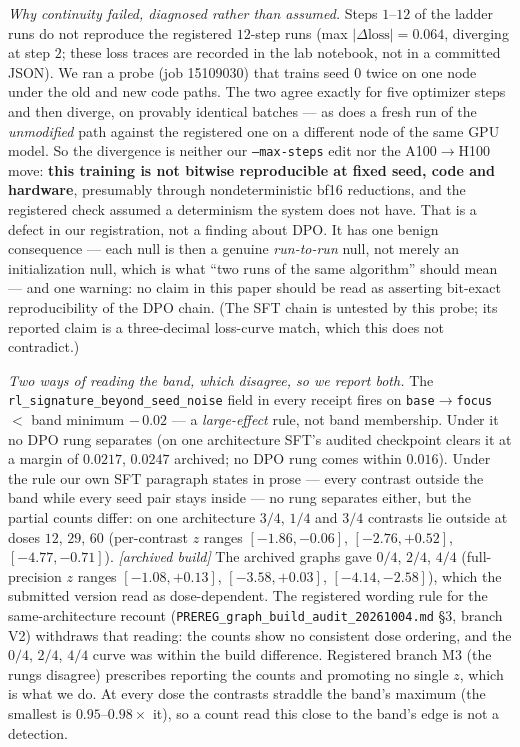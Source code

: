 \documentclass{article}
\begin{document}
\emph{Why continuity failed, diagnosed rather than assumed.} Steps $1$--$12$ of the ladder runs do not reproduce the registered $12$-step runs (max $|\Delta\text{loss}|=0.064$, diverging at step $2$; these loss traces are recorded in the lab notebook, not in a committed JSON). We ran a probe (job 15109030) that trains seed $0$ twice on one node under the old and new code paths. The two agree exactly for five optimizer steps and then diverge, on provably identical batches --- as does a fresh run of the \emph{unmodified} path against the registered one on a different node of the same GPU model. So the divergence is neither our \texttt{--max-steps} edit nor the A100$\to$H100 move: \textbf{this training is not bitwise reproducible at fixed seed, code and hardware}, presumably through nondeterministic bf16 reductions, and the registered check assumed a determinism the system does not have. That is a defect in our registration, not a finding about DPO. It has one benign consequence --- each null is then a genuine \emph{run-to-run} null, not merely an initialization null, which is what ``two runs of the same algorithm'' should mean --- and one warning: no claim in this paper should be read as asserting bit-exact reproducibility of the DPO chain. (The SFT chain is untested by this probe; its reported claim is a three-decimal loss-curve match, which this does not contradict.)

\emph{Two ways of reading the band, which disagree, so we report both.} The \texttt{rl\_signature\_beyond\_seed\_noise} field in every receipt fires on \texttt{base}$\to$\texttt{focus} $<$ band minimum $-\,0.02$ --- a \emph{large-effect} rule, not band membership. Under it no DPO rung separates (on one architecture SFT's audited checkpoint clears it at a margin of $0.0217$, $0.0247$ archived; no DPO rung comes within $0.016$). Under the rule our own SFT paragraph states in prose --- every contrast outside the band while every seed pair stays inside --- no rung separates either, but the partial counts differ: on one architecture $3/4$, $1/4$ and $3/4$ contrasts lie outside at doses $12$, $29$, $60$ (per-contrast $z$ ranges $[-1.86,-0.06]$, $[-2.76,+0.52]$, $[-4.77,-0.71]$). \emph{[archived build]} The archived graphs gave $0/4$, $2/4$, $4/4$ (full-precision $z$ ranges $[-1.08,+0.13]$, $[-3.58,+0.03]$, $[-4.14,-2.58]$), which the submitted version read as dose-dependent. The registered wording rule for the same-architecture recount (\texttt{PREREG\_graph\_build\_audit\_20261004.md} \S3, branch V2) withdraws that reading: the counts show no consistent dose ordering, and the $0/4$, $2/4$, $4/4$ curve was within the build difference. Registered branch M3 (the rungs disagree) prescribes reporting the counts and promoting no single $z$, which is what we do. At every dose the contrasts straddle the band's maximum (the smallest is $0.95$--$0.98\times$ it), so a count read this close to the band's edge is not a detection.
\end{document}
